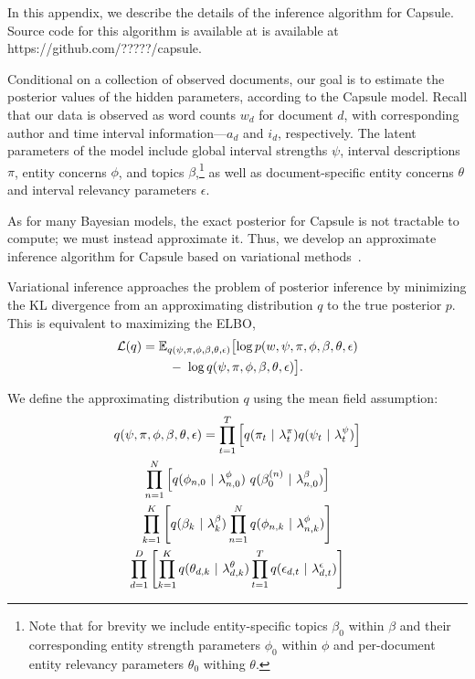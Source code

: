
In this appendix, we describe the details of the inference algorithm for Capsule. Source code for this algorithm is available at is available at https://github.com/?????/capsule.

Conditional on a collection of observed documents, our goal is to estimate the posterior values of the hidden parameters, according to the Capsule model.   Recall that our data is observed as word counts $w_d$ for document $d$, with corresponding author and time interval information---$a_d$ and $i_d$, respectively.
The latent parameters of the model include global interval strengths $\psi$, interval descriptions $\pi$, entity concerns $\phi$, and topics $\beta$,\footnote{Note that for brevity we include entity-specific topics $\beta_0$ within $\beta$ and their corresponding entity strength parameters $\phi_0$ within $\phi$ and per-document entity relevancy parameters $\theta_0$ withing $\theta$.} as well as document-specific entity concerns $\theta$ and interval relevancy parameters $\epsilon$.

As for many Bayesian models, the exact posterior for Capsule is not tractable to compute; we must instead approximate it.  Thus, we develop an approximate inference algorithm for Capsule based on variational methods~\cite{Wainwright:2008}.

Variational inference approaches the problem of posterior inference by minimizing the KL divergence from an approximating distribution $q$ to the true posterior $p$.
This is equivalent to maximizing the ELBO,
\begin{multline}
	\mathcal{L}(q)  = \mathbb{E}_{q(\psi, \pi, \phi, \beta, \theta, \epsilon)}\bigl[\log p(w, \psi, \pi, \phi, \beta, \theta, \epsilon) \\
	-~\log q(\psi, \pi, \phi, \beta, \theta, \epsilon)\bigr].
	\label{eq:elbo}
\end{multline}

We define the approximating distribution $q$ using the mean field assumption:
\begin{multline}
	q(\psi, \pi, \phi, \beta, \theta, \epsilon) = \prod_{t=1}^T \left[ q(\pi_{t} ~\vert~ \lambda^\pi_t) q(\psi_t ~\vert~ \lambda^\psi_t) \right] \\
		\prod_{n=1}^N \left[ q(\phi_{n,0} ~\vert~ \lambda^\phi_{n,0})~q(\beta^{(n)}_0 ~\vert~ \lambda^{\beta}_{n,0}) \right] \\
		\prod_{k=1}^K \left[ q(\beta_{k} ~\vert~ \lambda^\beta_k) \prod_{n=1}^N q(\phi_{n,k} ~\vert~ \lambda^\phi_{n,k}) \right] \\
		\prod_{d=1}^D \left[
				\prod_{k=1}^K q(\theta_{d,k} ~\vert~ \lambda^\theta_{d,k})
				\prod_{t=1}^T q(\epsilon_{d,t} ~\vert~ \lambda^\epsilon_{d,t})
			\right]
	\label{eq:q}
\end{multline}

